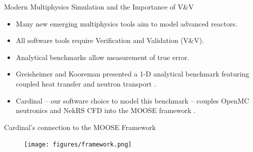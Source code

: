 \documentclass[9pt,t]{beamer}
\begin{document}
\begin{frame}{Modern Multiphysics Simulation and the Importance of V\&V}
    \pause
    \begin{itemize}
        \item <2-> Many new emerging multiphysics tools aim to model advanced reactors.
        \item <3-> All software tools require Verification and Validation (V\&V).
        \item <4-> Analytical benchmarks allow measurement of true error.
        \item <5-> Greisheimer and Kooreman presented a 1-D analytical benchmark featuring coupled heat transfer and neutron transport \cite{analytical-benchmark}.
        \item <6-> Cardinal \cite{novak2022-cardinal} -- our software choice to model this benchmark -- couples OpenMC \cite{openmc} neutronics and NekRS \cite{nekrs} CFD into the MOOSE framework \cite{lindsay2022moose}.
    \end{itemize}
\end{frame}

\begin{frame}{Cardinal's connection to the MOOSE Framework}
    \vspace*{-0.35cm}
    \begin{figure}[H]
        \centering
        \texttt{[image: figures/framework.png]}
    \end{figure}
\end{frame}


\end{document}
